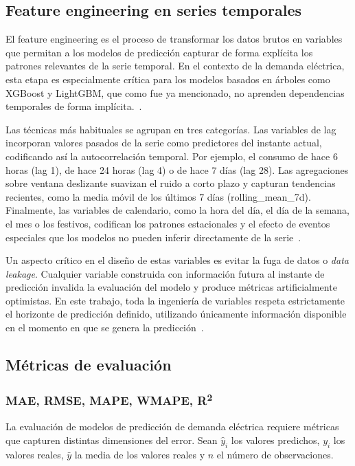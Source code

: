 \documentclass[12pt, a4paper]{article}
\begin{document}
\subsection{Feature engineering en series temporales}

El feature engineering es el proceso de transformar los datos brutos en variables que permitan a los modelos de predicción capturar de forma explícita los patrones relevantes de la serie temporal. En el contexto de la demanda eléctrica, esta etapa es especialmente crítica para los modelos basados en árboles como XGBoost y LightGBM, que como fue  ya mencionado, no aprenden dependencias temporales de forma implícita.~\cite{rubattu2023}.

Las técnicas más habituales se agrupan en tres categorías. Las variables de lag incorporan valores pasados de la serie como predictores del instante actual, codificando así la autocorrelación temporal. Por ejemplo, el consumo de hace 6 horas (lag 1), de hace 24 horas (lag 4) o de hace 7 días (lag 28). Las agregaciones sobre ventana deslizante suavizan el ruido a corto plazo y capturan tendencias recientes, como la media móvil de los últimos 7 días (rolling\_mean\_7d). Finalmente, las variables de calendario, como la hora del día, el día de la semana, el mes o los festivos, codifican los patrones estacionales y el efecto de eventos especiales que los modelos no pueden inferir directamente de la serie~\cite{rubattu2023}.

Un aspecto crítico en el diseño de estas variables es evitar la fuga de datos o \textit{data leakage}. Cualquier variable construida con información futura al instante de predicción invalida la evaluación del modelo y produce métricas artificialmente optimistas. En este trabajo, toda la ingeniería de variables respeta estrictamente el horizonte de predicción definido, utilizando únicamente información disponible en el momento en que se genera la predicción~\cite{rubattu2023}.

\subsection{Métricas de evaluación}

\subsubsection{MAE, RMSE, MAPE, WMAPE, R\textsuperscript{2}}

La evaluación de modelos de predicción de demanda eléctrica requiere métricas que capturen distintas dimensiones del error. Sean $\hat{y}_i$ los valores predichos, $y_i$ los valores reales, $\bar{y}$ la media de los valores reales y $n$ el número de observaciones.
\end{document}
